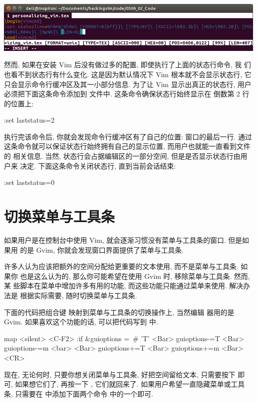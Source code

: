 \begin{warning}
\begin{center}
    \includegraphics[scale=0.8]{images/page27.png}
\end{center}
然而, 如果在安装 Vim 后没有做过多的配置, 即使执行了上面的状态行命令, 我
们也看不到状态行有什么变化. 这是因为默认情况下 Vim 根本就不会显示状态行,
它只会显示命令行缓冲区及其一小部分信息. 为了让 Vim 显示出真正的状态行, 用户
必须把下面这条命令添加到  文件中. 这条命令确保状态行始终显示在
倒数第 2 行的位置上:
\begin{vimcmd}
:set laststatus=2
\end{vimcmd}
执行完该命令后, 你就会发现命令行缓冲区有了自己的位置: 窗口的最后一行. 通过
这条命令就可以保证状态行始终拥有自己的显示位置, 而用户也就能一直看到文件的
相关信息. 当然, 状态行会占据编辑区的一部分空间, 但是是否显示状态行由用户来
决定. 下面这条命令关闭状态行, 直到当前会话结束:
\begin{vimcmd}
:set laststatus=0
\end{vimcmd}

\section{切换菜单与工具条}
\label{sec:toggle_menu_and_toolbar}
如果用户是在控制台中使用 Vim, 就会逐渐习惯没有菜单与工具条的窗口. 但是如果用
的是 Gvim, 你就会发现窗口界面提供了菜单与工具条.

许多人认为应该把额外的空间分配给更重要的文本使用, 而不是菜单与工具条. 如果你 
也是这么认为的, 那么你可能希望在使用 Gvim 时, 移除菜单与工具条. 然而, 某
些脚本在菜单中增加许多有用的功能, 而这些功能只能通过菜单来使用. 解决办法是
根据实际需要, 随时切换菜单与工具条.

下面的代码把组合键  映射到菜单与工具条的切换操作上, 当然编辑
器用的是 Gvim. 如果喜欢这个功能的话, 可以把代码写到  中.
\begin{vimcmd}
map <silent> <C-F2> :if &guioptions =~# 'T' <Bar>
                         \set guioptions-=T <Bar>
                         \set guioptions-=m <bar>
                    \else <Bar>
                         \set guioptions+=T <Bar>
                         \set guioptions+=m <Bar>
                      \endif<CR>
\end{vimcmd}
现在, 无论何时, 只要你想关闭菜单与工具条, 好把空间留给文本, 只需要按下
 即可, 如果想它们了, 再按一下 , 它们就回来了.
如果用户希望一直隐藏菜单或工具条, 只需要在  中添加下面两个命令
中的一个即可.


\end{warning}
